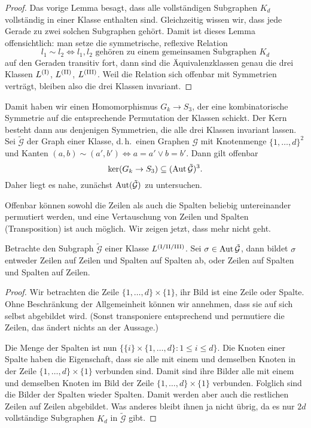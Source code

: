 \begin{proof}
Das vorige Lemma besagt, dass alle vollständigen Subgraphen $K_d$ vollständig in einer Klasse enthalten sind. Gleichzeitig wissen wir, dass jede Gerade zu zwei solchen Subgraphen gehört. Damit ist dieses Lemma offensichtlich: man setze die symmetrische, reflexive Relation
\begin{equation*}
l_1 \sim l_2 \Longleftrightarrow l_1, l_2 \text{ gehören zu einem gemeinsamen Subgraphen } K_d
\end{equation*}
auf den Geraden transitiv fort, dann sind die Äquivalenzklassen genau die drei Klassen $\Lcl(I)$, $\Lcl(II)$, $\Lcl(III)$. Weil die Relation sich offenbar mit Symmetrien verträgt, bleiben also die drei Klassen invariant.
\end{proof}

Damit haben wir einen Homomorphismus $G_k \to S_3$, der eine kombinatorische Symmetrie auf die entsprechende Permutation der Klassen schickt. Der Kern besteht dann aus denjenigen Symmetrien, die alle drei Klassen invariant lassen. Sei $\tilde{\mathcal G}$ der Graph einer Klasse, d.\,h.~einen Graphen $\mathcal G$ mit Knotenmenge $\{1,\dots,d\}^2$ und Kanten $(a,b) \sim (a',b') \Longleftrightarrow a=a' \vee b=b'$. Dann gilt offenbar
\begin{equation}
\ker(G_k \rightarrow S_3) \subseteq (\operatorname{Aut} \tilde{\mathcal G})^3.
\end{equation}
Daher liegt es nahe, zunächst $\operatorname{Aut}(\tilde{\mathcal G})$ zu untersuchen.

Offenbar können sowohl die Zeilen als auch die Spalten beliebig untereinander permutiert werden, und eine Vertauschung von Zeilen und Spalten (Transposition) ist auch möglich. Wir zeigen jetzt, dass mehr nicht geht.
\begin{lemma}
Betrachte den Subgraph $\tilde{\mathcal G}$ einer Klasse $\Lcl(I/II/III)$. Sei $\sigma \in \operatorname{Aut} \tilde{\mathcal G}$, dann bildet $\sigma$ entweder Zeilen auf Zeilen und Spalten auf Spalten ab, oder Zeilen auf Spalten und Spalten auf Zeilen.
\end{lemma}
\begin{proof}
Wir betrachten die Zeile $\{1,\dots,d\} \times \{1\}$, ihr Bild ist eine Zeile oder Spalte. Ohne Beschränkung der Allgemeinheit können wir annehmen, dass sie auf sich selbst abgebildet wird. (Sonst transponiere entsprechend und permutiere die Zeilen, das ändert nichts an der Aussage.)

Die Menge der Spalten ist nun $\{\{i\} \times \{1,\dots,d\} : 1 \leq i \leq d\}$. Die Knoten einer Spalte haben die Eigenschaft, dass sie alle mit einem und demselben Knoten in der Zeile $\{1,\dots,d\} \times \{1\}$ verbunden sind. Damit sind ihre Bilder alle mit einem und demselben Knoten im Bild der Zeile $\{1,\dots,d\} \times \{1\}$ verbunden. Folglich sind die Bilder der Spalten wieder Spalten. Damit werden aber auch die restlichen Zeilen auf Zeilen abgebildet. Was anderes bleibt ihnen ja nicht übrig, da es nur $2d$ vollständige Subgraphen $K_d$ in $\tilde{\mathcal G}$ gibt.
\end{proof}

